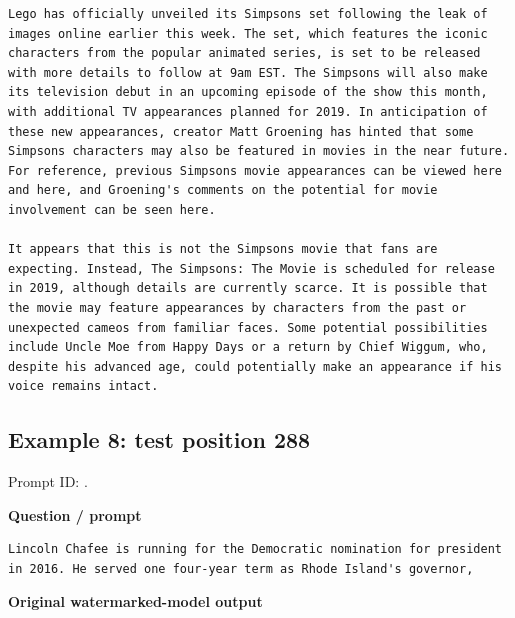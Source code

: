 \begin{Verbatim}
Lego has officially unveiled its Simpsons set following the leak of images online earlier this week. The set, which features the iconic characters from the popular animated series, is set to be released with more details to follow at 9am EST. The Simpsons will also make its television debut in an upcoming episode of the show this month, with additional TV appearances planned for 2019. In anticipation of these new appearances, creator Matt Groening has hinted that some Simpsons characters may also be featured in movies in the near future. For reference, previous Simpsons movie appearances can be viewed here and here, and Groening's comments on the potential for movie involvement can be seen here.

It appears that this is not the Simpsons movie that fans are expecting. Instead, The Simpsons: The Movie is scheduled for release in 2019, although details are currently scarce. It is possible that the movie may feature appearances by characters from the past or unexpected cameos from familiar faces. Some potential possibilities include Uncle Moe from Happy Days or a return by Chief Wiggum, who, despite his advanced age, could potentially make an appearance if his voice remains intact.
\end{Verbatim}

\subsection{Example 8: test position
288}\label{record-docs-watermarking-qualitative-paper-sir-vanilla-md-example-8-test-position-288}

Prompt ID:
\texttt{}.

\textbf{Question / prompt}

\begin{Verbatim}
Lincoln Chafee is running for the Democratic nomination for president in 2016. He served one four-year term as Rhode Island's governor,
\end{Verbatim}

\textbf{Original watermarked-model output}

